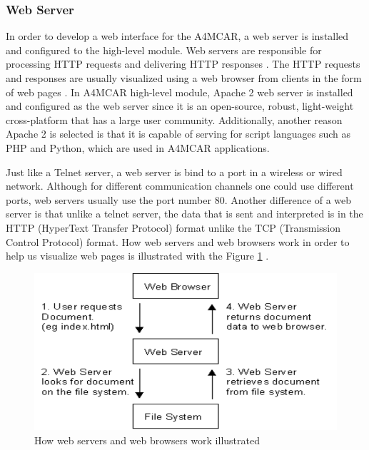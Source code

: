 \subsubsection{Web Server}
In order to develop a web interface for the A4MCAR, a web server is installed and configured to the high-level module. Web servers are responsible for processing HTTP requests and delivering HTTP responses \cite{apacheguide}. The HTTP requests and responses are usually visualized using a web browser from clients in the form of web pages \cite{apacheguide}. In A4MCAR high-level module, Apache 2 web server is installed and configured as the web server since it is an open-source, robust, light-weight cross-platform that has a large user community. Additionally, another reason Apache 2 is selected is that it is capable of serving for script languages such as PHP and Python, which are used in A4MCAR applications.

Just like a Telnet server, a web server is bind to a port in a wireless or wired network. Although for different communication channels one could use different ports, web servers usually use the port number 80. Another difference of a web server is that unlike a telnet server, the data that is sent and interpreted is in the HTTP (HyperText Transfer Protocol) \cite{webserver} format unlike the TCP (Transmission Control Protocol) format. How web servers and web browsers work in order to help us visualize web pages is illustrated with the Figure \ref{fig:webserver} \cite{webserver}. \\

\begin{figure}[!ht]
	\centering
	\includegraphics[scale=0.5]{content/images/webserver.png}
	\caption{How web servers and web browsers work illustrated \cite{webserver}}
	\label{fig:webserver}
\end{figure}

